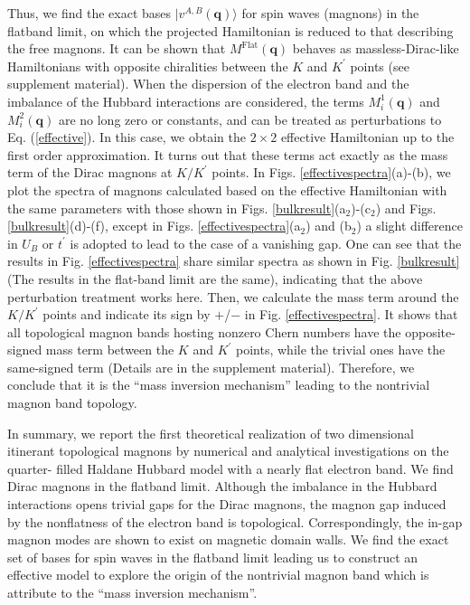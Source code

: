 \documentclass[amsmath,superscriptaddress,showpacs,aps,prl,twocolumn]{revtex4-1}
\begin{document}
Thus, we find the exact bases $|v^{A,B}(\mathbf{q})\rangle$ for spin waves (magnons) in the flatband limit, on which the projected Hamiltonian is reduced to that describing the free magnons. It can be shown that $M^\text{Flat}(\mathbf{q})$ behaves as massless-Dirac-like Hamiltonians with opposite chiralities between the $K$ and $K^\prime$ points (see supplement material). When the dispersion of the electron band and the imbalance of the Hubbard interactions are considered, the terms $M^1_i(\mathbf{q})$ and $M^2_i(\mathbf{q})$ are no long zero or constants, and can be treated as perturbations to Eq. (\ref{effective}). In this case, we obtain the $2\times 2$ effective Hamiltonian up to the first order approximation. It turns out that these terms act exactly as the mass term of the Dirac magnons at $K/K^\prime$ points. In Figs. \ref{effectivespectra}(a)-(b), we plot the spectra of magnons calculated based on the effective Hamiltonian with the same parameters with those shown in Figs. \ref{bulkresult}(a$_2$)-(c$_2$) and Figs. \ref{bulkresult}(d)-(f), except in Figs. \ref{effectivespectra}(a$_2$) and (b$_2$) a slight difference in $U_B$ or $t^{\prime}$ is adopted to lead to the case of a vanishing gap. One can see that the results in Fig. \ref{effectivespectra} share similar spectra as shown in Fig. \ref{bulkresult} (The results in the flat-band limit are the same), indicating that the above perturbation treatment works here. Then, we calculate the mass term around the $K/K^\prime$ points and indicate its sign by $+$/$-$ in Fig. \ref{effectivespectra}. It shows that all topological magnon bands hosting nonzero Chern numbers have the opposite-signed mass term between the $K$ and $K^\prime$ points, while the trivial ones have the same-signed term (Details are in the supplement material). Therefore, we conclude that it is the ``mass inversion mechanism'' leading to the nontrivial magnon band topology.

\par In summary, we report the first theoretical realization of two dimensional itinerant topological magnons by numerical and analytical investigations on the quarter- filled Haldane Hubbard model with a nearly flat electron band. We find Dirac magnons in the flatband limit. Although the imbalance in the Hubbard interactions opens trivial gaps for the Dirac magnons, the magnon gap induced by the nonflatness of the electron band is topological. Correspondingly, the in-gap magnon modes are shown to exist on magnetic domain walls. We find the exact set of bases for spin waves in the flatband limit leading us to construct an effective model to explore the origin of the nontrivial magnon band which is attribute to the ``mass inversion mechanism''.
\end{document}
